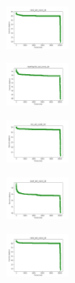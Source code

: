 \begin{figure}[H]
    \begin{subfigure}
        \centering
        \includegraphics[width=0.234\textwidth]{img/HS-LS/rand_set_const_20_277451237_cost.png}
    \end{subfigure}
    \hfill
    \begin{subfigure}
        \centering
        \includegraphics[width=0.234\textwidth]{img/HS-LS/newthyroid_set_const_20_277451237_cost.png}
    \end{subfigure}
    \hfill
    \begin{subfigure}
        \centering
        \includegraphics[width=0.234\textwidth]{img/HS-LS/iris_set_const_20_49258669_cost.png}
    \end{subfigure}
    \hfill
    \begin{subfigure}
        \centering
        \includegraphics[width=0.234\textwidth]{img/HS-LS/ecoli_set_const_20_49258669_cost.png}
    \end{subfigure}
    \hfill
    \begin{subfigure}
        \centering
        \includegraphics[width=0.234\textwidth]{img/HS-LS/rand_set_const_20_49258669_cost.png}
    \end{subfigure}
    \hfill
    \begin{subfigure}
        \centering

\end{subfigure}
\end{figure}
